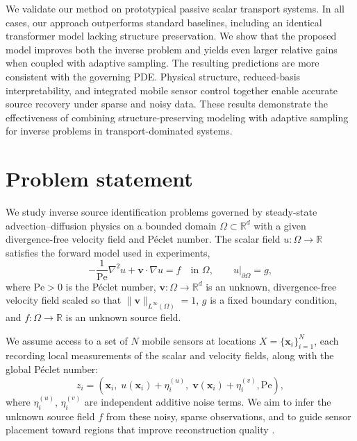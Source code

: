 \documentclass[onefignum,onetabnum]{siamart171218} %
\begin{document}
We validate our method on prototypical passive scalar transport systems. In all cases, our approach outperforms standard baselines, including an identical transformer model lacking structure preservation. We show that the proposed model improves both the inverse problem and yields even larger relative gains when coupled with adaptive sampling. The resulting predictions are more consistent with the governing PDE. Physical structure, reduced-basis interpretability, and integrated mobile sensor control together enable accurate source recovery under sparse and noisy data. These results demonstrate the effectiveness of combining structure-preserving modeling with adaptive sampling for inverse problems in transport-dominated systems.
\section{Problem statement}
\label{sec:problem_statement}
We study inverse source identification problems governed by steady-state advection–diffusion physics on a bounded domain $\Omega \subset \mathbb{R}^d$ with a given divergence-free velocity field and P\'eclet number. The scalar field $u : \Omega \to \mathbb{R}$ satisfies the forward model used in experiments,
\begin{equation}
    \label{eq:advec-diff}
    - \frac{1}{\text{Pe}} \nabla^2 u + \mathbf{v} \cdot \nabla u = f
    \quad \text{in } \Omega,
    \qquad
    u|_{\partial \Omega} = g,
\end{equation}
where $\text{Pe} > 0$ is the P\'eclet number,
$\mathbf{v}: \Omega \to \mathbb{R}^d$
is an unknown, divergence-free velocity field scaled so that \(\|\mathbf v\|_{L^\infty(\Omega)}=1\), $g$ is a fixed boundary condition, and $f:\Omega \to \mathbb{R}$ is an unknown source field.

We assume access to a set of $N$ mobile sensors at locations $X = \{\mathbf{x}_i\}_{i=1}^N$, each recording local measurements of the scalar and velocity fields, along with the global P\'eclet number:
\begin{equation}
    \label{eq:z}
    z_i = \left( \mathbf{x}_i,\; u(\mathbf{x}_i) + \eta_i^{(u)},\; \mathbf{v}(\mathbf{x}_i) + \eta_i^{(v)}, \text{Pe} \right),
\end{equation}
\noindent where $\eta_i^{(u)}$, $\eta_i^{(v)}$ are independent additive noise terms. We aim to infer the unknown source field $f$ from these noisy, sparse observations, and to guide sensor placement toward regions that improve reconstruction quality \cite{tarantola2005inverse}.
\end{document}

